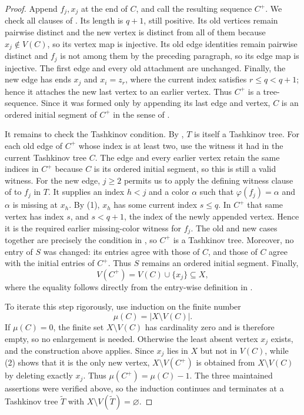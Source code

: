 \begin{proof}
Append $f_j,x_j$ at the end of $C$, and call the resulting sequence $C^+$.
We check all clauses of .  Its length is $q+1$, still
positive.  Its old vertices remain pairwise distinct and the new vertex is
distinct from all of them because $x_j\notin V(C)$, so its vertex map is
injective.  Its old edge identities remain pairwise distinct and $f_j$ is
not among them by the preceding paragraph, so its edge map is injective.
The first edge and every old attachment are unchanged.  Finally, the new
edge has ends $x_j$ and $x_i=z_r$, where the current index satisfies
$r\leq q<q+1$; hence it attaches the new last vertex to an earlier vertex.
Thus $C^+$ is a tree-sequence.  Since it was formed only by appending its
last edge and vertex, $C$ is an ordered initial segment of $C^+$ in the
sense of .

It remains to check the Tashkinov condition.  By
, $T$ is itself a Tashkinov tree.
For each old edge of $C^+$ whose index is at least two, use the witness it
had in the current Tashkinov tree $C$.  The edge and every earlier vertex
retain the same indices in $C^+$ because $C$ is its ordered initial segment,
so this is still a valid witness.  For the new edge, $j\geq2$ permits us to
apply the defining witness clause of  to $f_j$ in
$T$.  It supplies an index $h<j$ and a color $\alpha$ such that
$\varphi(f_j)=\alpha$ and $\alpha$ is missing at $x_h$.  By (1), $x_h$ has
some current index $s\leq q$.  In $C^+$ that same vertex has index $s$, and
$s<q+1$, the index of the newly appended vertex.  Hence it is the required
earlier missing-color witness for $f_j$.  The old and new cases together
are precisely the condition in , so $C^+$ is a
Tashkinov tree.  Moreover, no entry of $S$ was changed: its entries agree
with those of $C$, and those of $C$ agree with the initial entries of
$C^+$.  Thus $S$ remains an ordered initial segment.  Finally,
\[
 V(C^+)=V(C)\cup\{x_j\}\subseteq X, \tag{2}
\]
where the equality follows directly from the entry-wise definition in
.

To iterate this step rigorously, use induction on the finite number
\[
 \mu(C)=|X\setminus V(C)|.
\]
If $\mu(C)=0$, the finite set $X\setminus V(C)$ has cardinality zero and
is therefore empty, so no enlargement is needed.  Otherwise the least
absent vertex $x_j$ exists, and the construction above applies.  Since
$x_j$ lies in $X$ but not in $V(C)$, while (2) shows that it is the only
new vertex, $X\setminus V(C^+)$ is obtained from $X\setminus V(C)$ by
deleting exactly $x_j$.  Thus $\mu(C^+)=\mu(C)-1$.  The three maintained
assertions were verified above, so the induction continues and terminates
at a Tashkinov tree $\widetilde T$ with
$X\setminus V(\widetilde T)=\varnothing$.


\end{proof}
